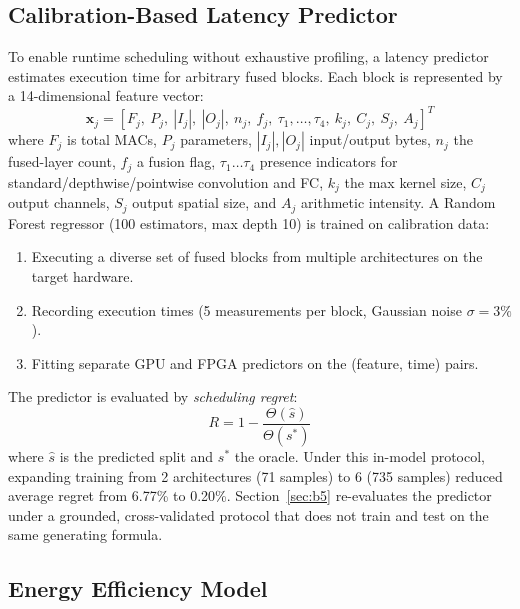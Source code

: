 \documentclass[runningheads]{llncs}
\begin{document}
\subsection{Calibration-Based Latency Predictor}\label{sec:predictor}

To enable runtime scheduling without exhaustive profiling, a latency predictor estimates execution time for arbitrary fused blocks. Each block is represented by a 14-dimensional feature vector:
\begin{equation}
    \mathbf{x}_j = [F_j,\ P_j,\ |I_j|,\ |O_j|,\ n_j,\ f_j,\ \tau_1, \ldots, \tau_4,\ k_j,\ C_j,\ S_j,\ A_j]^T
\end{equation}
where $F_j$ is total MACs, $P_j$ parameters, $|I_j|,|O_j|$ input/output bytes, $n_j$ the fused-layer count, $f_j$ a fusion flag, $\tau_1{\ldots}\tau_4$ presence indicators for standard/depthwise/pointwise convolution and FC, $k_j$ the max kernel size, $C_j$ output channels, $S_j$ output spatial size, and $A_j$ arithmetic intensity. A Random Forest regressor (100 estimators, max depth 10) is trained on calibration data:
\begin{enumerate}
    \item Executing a diverse set of fused blocks from multiple architectures on the target hardware.
    \item Recording execution times (5 measurements per block, Gaussian noise $\sigma=3\%$).
    \item Fitting separate GPU and FPGA predictors on the (feature, time) pairs.
\end{enumerate}
The predictor is evaluated by \textit{scheduling regret}:
\begin{equation}\label{eq:regret}
    R = 1 - \frac{\Theta(\hat{s})}{\Theta(s^*)}
\end{equation}
where $\hat{s}$ is the predicted split and $s^*$ the oracle. Under this in-model protocol, expanding training from 2 architectures (71 samples) to 6 (735 samples) reduced average regret from 6.77\% to 0.20\%. Section~\ref{sec:b5} re-evaluates the predictor under a grounded, cross-validated protocol that does not train and test on the same generating formula.

\subsection{Energy Efficiency Model}\label{sec:power}
\end{document}
